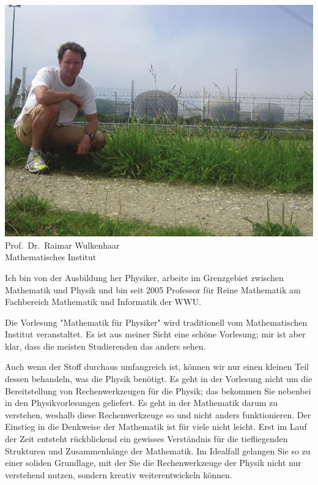 \begin{multicols}{2}
\begin{center}
	\includegraphics[width=\columnwidth, height=0.35\textheight]{res/vorstellungsfotos/wulkenhaar.png}\\
	\smallskip
 	Prof.\ Dr.\ Raimar Wulkenhaar\\
	Mathematisches Institut
\end{center}

Ich bin von der Ausbildung her Physiker, arbeite im Grenzgebiet zwischen Mathematik und Physik und bin seit 2005 Professor für Reine Mathematik am Fachbereich Mathematik und Informatik der WWU.

Die Vorlesung "Mathematik für Physiker" wird traditionell vom Mathematischen Institut veranstaltet. Es ist aus meiner Sicht eine schöne Vorlesung; mir ist aber klar, dass die meisten Studierenden das anders sehen.

Auch wenn der Stoff durchaus umfangreich ist, können wir nur einen kleinen Teil dessen behandeln, was die Physik benötigt. Es geht in der Vorlesung nicht um die Bereitstellung von Rechenwerkzeugen für die Physik; das bekommen Sie nebenbei in den Physikvorlesungen geliefert. Es geht in der Mathematik darum zu verstehen, weshalb diese Rechenwerkzeuge so und nicht anders funktionieren. Der Einstieg in die Denkweise der Mathematik ist für viele nicht leicht. Erst im Lauf der Zeit entsteht rückblickend ein gewisses Verständnis für die tiefliegenden Strukturen und Zusammenhänge der Mathematik. Im Idealfall gelangen Sie so zu einer soliden Grundlage, mit der Sie die Rechenwerkzeuge der Physik nicht nur verstehend nutzen, sondern kreativ weiterentwickeln können.



\end{multicols}
